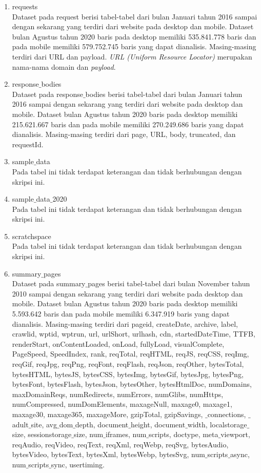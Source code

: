 \begin{enumerate}
	\item requests\\
	Dataset pada request berisi tabel-tabel dari bulan Januari tahun 2016 sampai dengan sekarang yang terdiri dari website pada desktop dan mobile. Dataset bulan Agustus tahun 2020 baris pada desktop memiliki 535.841.778 baris dan pada mobile memiliki 579.752.745 baris yang dapat dianalisis. Masing-masing terdiri dari URL dan payload. \textit{URL (Uniform Resource Locator)} merupakan nama-nama domain dan \textit{payload}.
	\item response$\_$bodies\\
	Dataset pada response$\_$bodies berisi tabel-tabel dari bulan Januari tahun 2016 sampai dengan sekarang yang terdiri dari website pada desktop dan mobile. Dataset bulan Agustus tahun 2020 baris pada desktop memiliki 215.621.667 baris dan pada mobile memiliki 270.249.686 baris yang dapat dianalisis. Masing-masing terdiri dari page, URL, body, truncated, dan requestId.
	\item sample$\_$data\\
	Pada tabel ini tidak terdapat keterangan dan tidak berhubungan dengan skripsi ini.
	\item sample$\_$data$\_$2020\\
	Pada tabel ini tidak terdapat keterangan dan tidak berhubungan dengan skripsi ini.
	\item scratchspace\\
	Pada tabel ini tidak terdapat keterangan dan tidak berhubungan dengan skripsi ini.
	\item summary$\_$pages\\
	Dataset pada summary$\_$pages berisi tabel-tabel dari bulan November tahun 2010 sampai dengan sekarang yang terdiri dari website pada desktop dan mobile. Dataset bulan Agustus tahun 2020 baris pada desktop memiliki 5.593.642 baris dan pada mobile memiliki 6.347.919 baris yang dapat dianalisis. Masing-masing terdiri dari pageid, createDate, archive, label, crawlid, wptid, wptrun, url, urlShort, urlhash, cdn, startedDateTime, TTFB, renderStart, onContentLoaded, onLoad, fullyLoad, visualComplete, PageSpeed, SpeedIndex, rank, reqTotal, reqHTML, reqJS, reqCSS, reqImg, reqGif, reqJpg, reqPng, reqFont, reqFlash, reqJson, reqOther, bytesTotal, bytesHTML, bytesJS, bytesCSS, bytesImg, bytesGif, bytesJpg, bytesPng, bytesFont, bytesFlash, bytesJson, bytesOther, bytesHtmlDoc, numDomains, maxDomainReqs, numRedirects, numErrors, numGlibs, numHttps, numCompressed, numDomElements, maxageNull, maxage0, maxage1, maxage30, maxage365, maxageMore, gzipTotal, gzipSavings, $\_$connections, $\_$adult$\_$site, avg$\_$dom$\_$depth, document$\_$height, document$\_$width, localstorage$\_$size, sessionstorage$\_$size, num$\_$iframes, num$\_$scripts, doctype, meta$\_$viewport, reqAudio, reqVideo, reqText, reqXml, reqWebp, reqSvg, bytesAudio, bytesVideo, bytesText, bytesXml, bytesWebp, bytesSvg, num$\_$scripts$\_$async, num$\_$scripts$\_$sync, usertiming.

\end{enumerate}
